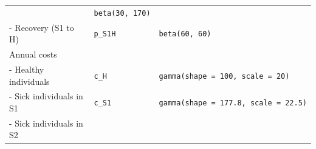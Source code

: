 \documentclass[]{book}
\begin{document}
\begin{longtable}[]{@{}lll@{}}
\begin{minipage}[t]{0.13\columnwidth}
\end{minipage} & \begin{minipage}[t]{0.45\columnwidth}\raggedright\strut
\texttt{beta(30,\ 170)}\strut
\end{minipage}\tabularnewline
\begin{minipage}[t]{0.33\columnwidth}\raggedright\strut
- Recovery (S1 to H)\strut
\end{minipage} & \begin{minipage}[t]{0.13\columnwidth}\raggedright\strut
\texttt{p\_S1H}\strut
\end{minipage} & \begin{minipage}[t]{0.45\columnwidth}\raggedright\strut
\texttt{beta(60,\ 60)}\strut
\end{minipage}\tabularnewline
\begin{minipage}[t]{0.33\columnwidth}\raggedright\strut
Annual costs\strut
\end{minipage} & \begin{minipage}[t]{0.13\columnwidth}\raggedright\strut
\strut
\end{minipage} & \begin{minipage}[t]{0.45\columnwidth}\raggedright\strut
\strut
\end{minipage}\tabularnewline
\begin{minipage}[t]{0.33\columnwidth}\raggedright\strut
- Healthy individuals\strut
\end{minipage} & \begin{minipage}[t]{0.13\columnwidth}\raggedright\strut
\texttt{c\_H}\strut
\end{minipage} & \begin{minipage}[t]{0.45\columnwidth}\raggedright\strut
\texttt{gamma(shape\ =\ 100,\ scale\ =\ 20)}\strut
\end{minipage}\tabularnewline
\begin{minipage}[t]{0.33\columnwidth}\raggedright\strut
- Sick individuals in S1\strut
\end{minipage} & \begin{minipage}[t]{0.13\columnwidth}\raggedright\strut
\texttt{c\_S1}\strut
\end{minipage} & \begin{minipage}[t]{0.45\columnwidth}\raggedright\strut
\texttt{gamma(shape\ =\ 177.8,\ scale\ =\ 22.5)}\strut
\end{minipage}\tabularnewline
\begin{minipage}[t]{0.33\columnwidth}\raggedright\strut
- Sick individuals in S2\strut
\end{minipage} & \begin{minipage}[t]{0.13\columnwidth}\raggedright\strut

\end{minipage}
\end{longtable}
\end{document}
